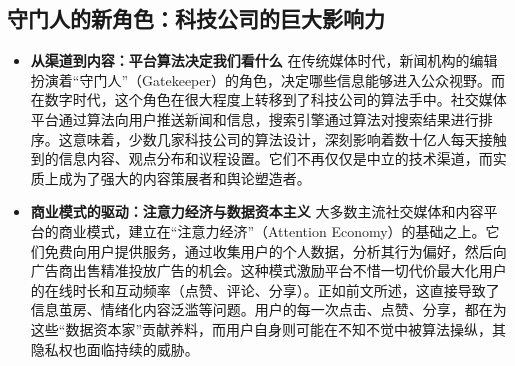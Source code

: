 \documentclass[UTF8, 10pt]{ctexbook}
\begin{document}
\subsection{守门人的新角色：科技公司的巨大影响力}
\begin{itemize}
    \item \textbf{从渠道到内容：平台算法决定我们看什么}
    在传统媒体时代，新闻机构的编辑扮演着“守门人”（Gatekeeper）的角色，决定哪些信息能够进入公众视野。而在数字时代，这个角色在很大程度上转移到了科技公司的算法手中。社交媒体平台通过算法向用户推送新闻和信息，搜索引擎通过算法对搜索结果进行排序。这意味着，少数几家科技公司的算法设计，深刻影响着数十亿人每天接触到的信息内容、观点分布和议程设置。它们不再仅仅是中立的技术渠道，而实质上成为了强大的内容策展者和舆论塑造者。

    \item \textbf{商业模式的驱动：注意力经济与数据资本主义}
    大多数主流社交媒体和内容平台的商业模式，建立在“注意力经济”（Attention Economy）的基础之上。它们免费向用户提供服务，通过收集用户的个人数据，分析其行为偏好，然后向广告商出售精准投放广告的机会。这种模式激励平台不惜一切代价最大化用户的在线时长和互动频率（点赞、评论、分享）。正如前文所述，这直接导致了信息茧房、情绪化内容泛滥等问题。用户的每一次点击、点赞、分享，都在为这些“数据资本家”贡献养料，而用户自身则可能在不知不觉中被算法操纵，其隐私权也面临持续的威胁。
\end{itemize}
\end{document}
